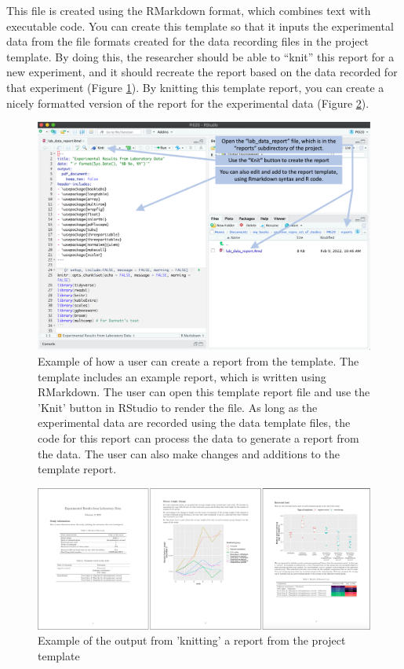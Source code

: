 \documentclass[]{tufte-book}
\begin{document}
This file is created using the RMarkdown format,
which combines text with executable code. You can create this template so that it
inputs the experimental data from the file formats created for the data recording
files in the project template. By doing this, the researcher should be able to ``knit''
this report for a new experiment, and it should recreate the report based on the
data recorded for that experiment (Figure \ref{fig:makingareport}). By knitting
this template report, you can create a nicely formatted version of the report for
the experimental data (Figure \ref{fig:examplereport1}).

\begin{figure}
\includegraphics[width=\textwidth]{figures/project_opening_and_running_report} \caption[Example of how a user can create a report from the template]{Example of how a user can create a report from the template. The template includes an example report, which is written using RMarkdown. The user can open this template report file and use the 'Knit' button in RStudio to render the file. As long as the experimental data are recorded using the data template files, the code for this report can process the data to generate a report from the data. The user can also make changes and additions to the template report.}\label{fig:makingareport}
\end{figure}

\begin{figure}
\includegraphics[width=\textwidth]{figures/project_example_report_study001} \caption[Example of the output from 'knitting' a report from the project template]{Example of the output from 'knitting' a report from the project template}\label{fig:examplereport1}
\end{figure}
\end{document}

